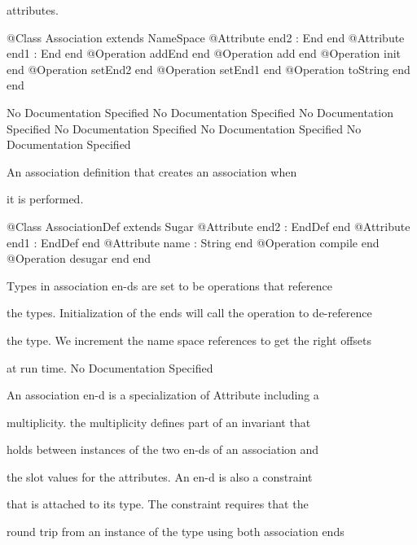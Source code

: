       attributes.
\begin{Interface}
@Class Association extends NameSpace
  @Attribute end2 : End end
  @Attribute end1 : End end
  @Operation addEnd end
  @Operation add end
  @Operation init end
  @Operation setEnd2 end
  @Operation setEnd1 end
  @Operation toString end
end
\end{Interface}
No Documentation Specified
No Documentation Specified
No Documentation Specified
No Documentation Specified
No Documentation Specified
No Documentation Specified

      An association definition that creates an association when

      it is performed.
\begin{Interface}
@Class AssociationDef extends Sugar
  @Attribute end2 : EndDef end
  @Attribute end1 : EndDef end
  @Attribute name : String end
  @Operation compile end
  @Operation desugar end
end
\end{Interface}

        Types in association en-ds are set to be operations that reference

        the types. Initialization of the ends will call the operation to de-reference

        the type. We increment the name space references to get the right offsets

        at run time.
No Documentation Specified

      An association en-d is a specialization of Attribute including a

      multiplicity. the multiplicity defines part of an invariant that

      holds between instances of the two en-ds of an association and

      the slot values for the attributes. An en-d is also a constraint

      that is attached to its type. The constraint requires that the

      round trip from an instance of the type using both association ends

